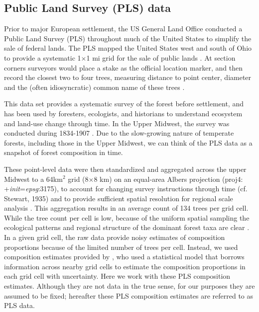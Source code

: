 \documentclass[12pt]{article}
\begin{document}
\subsection{Public Land Survey (PLS) data}
Prior to major European settlement, the US General Land Office
conducted a Public Land Survey (PLS) throughout much of the United
States to simplify the sale of federal lands. The PLS mapped the
United States west and south of Ohio to provide a systematic
1$\times$1 mi grid for the sale of public lands
\citep{stewart1935public, white1983history}. At section corners
surveyors would place a stake as the official location marker, and
then record the closest two to four trees, measuring distance to point
center, diameter and the (often idiosyncratic) common name of these
trees \citep{mladenoff2002narrowing}.  

This data set provides a systematic survey of the forest
before settlement, and has been used by foresters, ecologists, and
historians to understand ecosystem and land-use change through
time. In the Upper Midwest, the survey was conducted during 1834-1907
\citep{stewart1935public}. Due to the slow-growing nature of temperate
forests, including those in the Upper Midwest, we can think of the PLS
data as a snapshot of forest composition in time.

These point-level data were then standardized and aggregated across
the upper Midwest to a 64km$^2$ grid (8$\times$8 km) on an equal-area
Albers projection (proj4: +\textit{init}=\textit{epsg}:3175), to
account for changing survey instructions through time (cf. Stewart,
1935) and to provide sufficient spatial resolution for regional scale
analysis \citep{goring_witness}.  This aggregation results in an
average count of 134 trees per grid cell. While the tree count per
cell is low, because of the uniform spatial sampling the ecological
patterns and regional structure of the dominant forest taxa are clear
\citep{goring_witness}. In a given grid cell, the raw data provide
noisy estimates of composition proportions because of the limited
number of trees per cell. Instead, we used composition estimates
provided by \citet{paciorek2015}, who used a statistical model that
borrows information across nearby grid cells to estimate the
composition proportions in each grid cell with uncertainty. Here we
work with these PLS composition estimates. Although they are not data
in the true sense, for our purposes they are assumed to be fixed;
hereafter these PLS composition estimates are referred to as PLS data.
\end{document}
